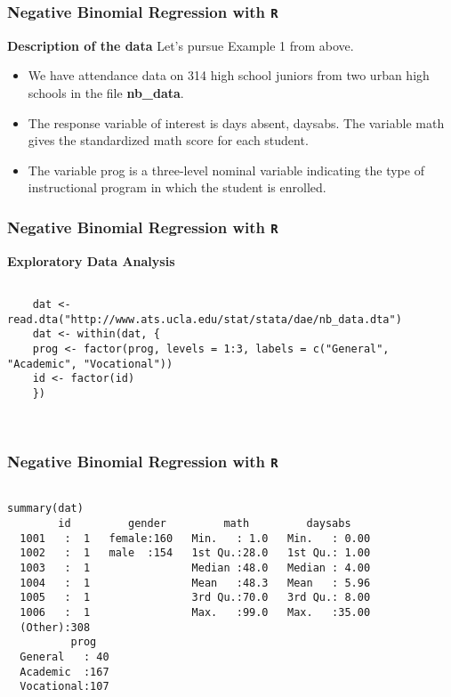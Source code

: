 \documentclass[00-GLMregslides.tex]{subfiles}
\begin{document}
\begin{frame}[fragile]
	\frametitle{Negative Binomial Regression with \texttt{R} }
	\Large
	
\textbf{Description of the data}
Let's pursue Example 1 from above.
\begin{itemize}
\item We have attendance data on 314 high school juniors from two urban high schools in the file \textbf{nb\_data}. 
\item The response variable of interest is days absent, daysabs. The variable math gives the standardized math score for each student. 
\item The variable prog is a three-level nominal variable indicating the type of instructional program in which the student is enrolled.
\end{itemize}
\end{frame}
\begin{frame}[fragile]
	\frametitle{Negative Binomial Regression with \texttt{R} }
	\Large
\textbf{Exploratory Data Analysis}	


\begin{framed}
	\begin{verbatim}
	
	dat <- read.dta("http://www.ats.ucla.edu/stat/stata/dae/nb_data.dta")
	dat <- within(dat, {
	prog <- factor(prog, levels = 1:3, labels = c("General", "Academic", "Vocational"))
	id <- factor(id)
	})
	
	
	\end{verbatim}	
\end{framed}

\end{frame}
\begin{frame}[fragile]
	\frametitle{Negative Binomial Regression with \texttt{R} }
	\Large

\begin{framed}
	\begin{verbatim}
	
summary(dat)
        id         gender         math         daysabs     
  1001   :  1   female:160   Min.   : 1.0   Min.   : 0.00  
  1002   :  1   male  :154   1st Qu.:28.0   1st Qu.: 1.00  
  1003   :  1                Median :48.0   Median : 4.00  
  1004   :  1                Mean   :48.3   Mean   : 5.96  
  1005   :  1                3rd Qu.:70.0   3rd Qu.: 8.00  
  1006   :  1                Max.   :99.0   Max.   :35.00  
  (Other):308                                              
          prog    
  General   : 40  
  Academic  :167  
  Vocational:107  
   
	
	\end{verbatim}	
\end{framed}

	
               
\end{frame}
\end{document}
